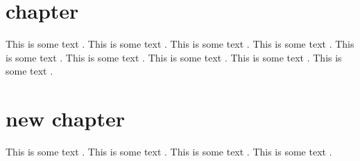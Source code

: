 \documentclass[10pt]{newsiambook}
\begin{document}
\frontmatter
%
\tableofcontents
%
\listoffigures
\listoftables
%
%
%

\mainmatter
\chapter{chapter}
This is  some text .
This is  some text .
This is  some text .
This is  some text .
This is  some text .
This is  some text .
This is  some text .
This is  some text .
This is  some text .

\chapter{new chapter}
This is  some text .
This is  some text .
This is  some text .
This is  some text .


%

\printindex
\end{document}
